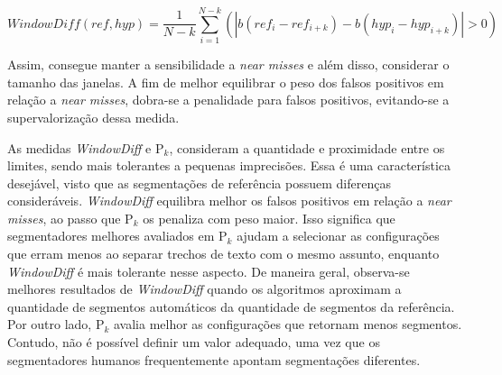 \begin{equation}
	WindowDiff(ref,hyp) = \frac{1}{N-k}\sum_{i=1}^{N-k}(|b(ref_i - ref_{i+k}) - b(hyp_i - hyp_{i+k})| > 0)
	\label{equ:windiff}
\end{equation}


Assim, consegue manter a sensibilidade a \textit{near misses} e além disso, considerar o tamanho das janelas.  A fim de melhor equilibrar o peso dos falsos positivos em relação a \textit{near misses}, dobra-se a penalidade para falsos positivos, evitando-se a supervalorização dessa medida.  %

As medidas \textit{WindowDiff} e P$_k$, consideram a quantidade e proximidade entre os limites, sendo mais tolerantes a pequenas imprecisões. Essa é uma característica desejável, visto que as segmentações de referência possuem diferenças consideráveis. \textit{WindowDiff} equilibra melhor os falsos positivos em relação a \textit{near misses}, ao passo que P$_k$ os penaliza com peso maior. Isso significa que segmentadores melhores avaliados em P$_k$ ajudam a selecionar as configurações que erram menos ao separar trechos de texto com o mesmo assunto, enquanto \textit{WindowDiff} é mais tolerante nesse aspecto.  De maneira geral, observa-se  melhores resultados de \textit{WindowDiff} quando os algoritmos aproximam a quantidade de segmentos automáticos da quantidade de segmentos da referência. Por outro lado, P$_k$ avalia melhor as configurações que retornam menos segmentos. Contudo, não é possível definir um valor adequado, uma vez que os segmentadores humanos frequentemente apontam segmentações diferentes.


